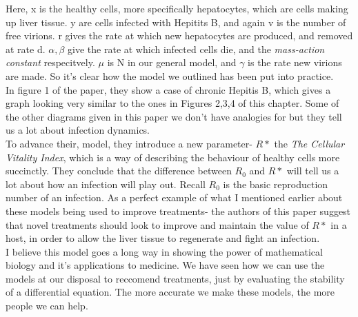 Here, x is the healthy cells, more specifically hepatocytes, which are cells making up liver tissue. y are cells infected with Hepitits B, and again v is the number of free virions. r gives the rate at which new hepatocytes are produced, and removed at rate d. $\alpha, \beta$ give the rate at which infected cells die, and the  \textit{mass-action constant} respecitvely. $\mu$ is N in our general model, and  $\gamma$ is the rate new virions are made. So it's clear how the model we outlined has been put into practice. \\

In figure 1 of the paper, they show a case of chronic Hepitis B, which gives a graph looking very similar to the ones in Figures 2,3,4 of this chapter. Some of the other diagrams given in this paper we don't have analogies for but they tell us a lot about infection dynamics. \\

To advance their, model, they introduce a new parameter- $R*$ the  \textit{The Cellular Vitality Index}, which is a way of describing the behaviour of healthy cells more succinctly. They conclude that the difference between $R_0$ and  $R*$ will tell us a lot about how an infection will play out. Recall  $R_0$ is the basic reproduction number of an infection. As a perfect example of what I mentioned earlier about these models being used to improve treatments- the authors of this paper suggest that novel treatments should look to improve and maintain the value of  $R*$ in a host, in order to allow the liver tissue to regenerate and fight an infection. \\

I believe this model goes a long way in showing the power of mathematical biology and it's applications to medicine. We have seen how we can use the models at our disposal to reccomend treatments, just by evaluating the stability of a differential equation. The more accurate we make these models, the more people we can help.


{}

